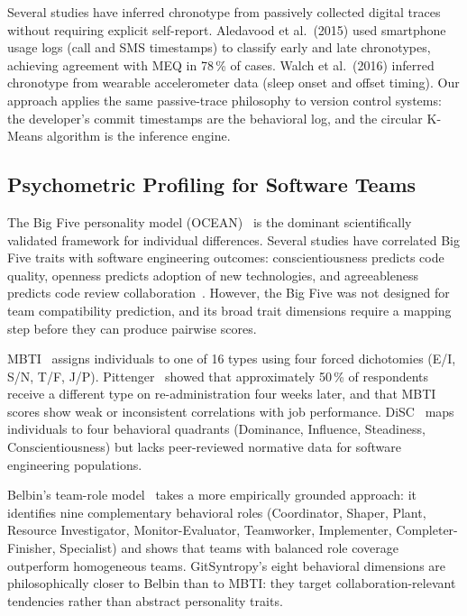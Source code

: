 \documentclass[conference]{IEEEtran}
\begin{document}
Several studies have inferred chronotype from passively collected
digital traces without requiring explicit self-report.
Aledavood et al.\ (2015) used smartphone usage logs (call and SMS
timestamps) to classify early and late chronotypes, achieving
agreement with MEQ in 78\,\% of cases.  Walch et al.\ (2016)
inferred chronotype from wearable accelerometer data (sleep onset
and offset timing).  Our approach applies the same passive-trace
philosophy to version control systems: the developer's commit
timestamps are the behavioral log, and the circular K-Means
algorithm is the inference engine.

\subsection{Psychometric Profiling for Software Teams}

The Big Five personality model (OCEAN)~\cite{mccrae1987} is the
dominant scientifically validated framework for individual
differences.  Several studies have correlated Big Five traits with
software engineering outcomes: conscientiousness predicts code
quality, openness predicts adoption of new technologies, and
agreeableness predicts code review collaboration~\cite{halfhill2005}.
However, the Big Five was not designed for team compatibility
prediction, and its broad trait dimensions require a mapping
step before they can produce pairwise scores.

MBTI~\cite{myers1943} assigns individuals to one of 16 types using
four forced dichotomies (E/I, S/N, T/F, J/P).  Pittenger~\cite{pittenger1993}
showed that approximately 50\,\% of respondents receive a different
type on re-administration four weeks later, and that MBTI
scores show weak or inconsistent correlations with job performance.
DiSC~\cite{marston1928} maps individuals to four behavioral quadrants
(Dominance, Influence, Steadiness, Conscientiousness) but lacks
peer-reviewed normative data for software engineering populations.

Belbin's team-role model~\cite{belbin1981} takes a more empirically
grounded approach: it identifies nine complementary behavioral roles
(Coordinator, Shaper, Plant, Resource Investigator, Monitor-Evaluator,
Teamworker, Implementer, Completer-Finisher, Specialist) and shows
that teams with balanced role coverage outperform homogeneous teams.
GitSyntropy's eight behavioral dimensions are philosophically closer
to Belbin than to MBTI: they target collaboration-relevant tendencies
rather than abstract personality traits.
\end{document}
